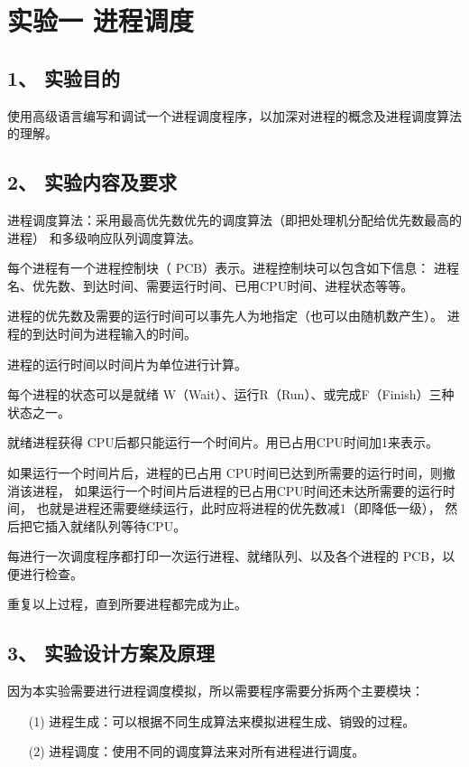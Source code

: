 \documentclass[12bp]{guo}
\begin{document}
\section{实验一 进程调度}

\subsection{1、 实验目的}

使用高级语言编写和调试一个进程调度程序，以加深对进程的概念及进程调度算法的理解。

\subsection{2、 实验内容及要求}

进程调度算法：采用最高优先数优先的调度算法（即把处理机分配给优先数最高的进程）
和多级响应队列调度算法。


每个进程有一个进程控制块（ PCB）表示。进程控制块可以包含如下信息：
进程名、优先数、到达时间、需要运行时间、已用CPU时间、进程状态等等。


进程的优先数及需要的运行时间可以事先人为地指定（也可以由随机数产生）。
进程的到达时间为进程输入的时间。


进程的运行时间以时间片为单位进行计算。


每个进程的状态可以是就绪 W（Wait）、运行R（Run）、或完成F（Finish）三种状态之一。


就绪进程获得 CPU后都只能运行一个时间片。用已占用CPU时间加1来表示。


如果运行一个时间片后，进程的已占用 CPU时间已达到所需要的运行时间，则撤消该进程，
如果运行一个时间片后进程的已占用CPU时间还未达所需要的运行时间，
也就是进程还需要继续运行，此时应将进程的优先数减1（即降低一级），
然后把它插入就绪队列等待CPU。


每进行一次调度程序都打印一次运行进程、就绪队列、以及各个进程的 PCB，以便进行检查。 　　


重复以上过程，直到所要进程都完成为止。

\subsection{3、 实验设计方案及原理}

因为本实验需要进行进程调度模拟，所以需要程序需要分拆两个主要模块：

\begin{enumerate}
    \item[(1)] 进程生成：可以根据不同生成算法来模拟进程生成、销毁的过程。
    \item[(2)] 进程调度：使用不同的调度算法来对所有进程进行调度。
\end{enumerate}
\end{document}
